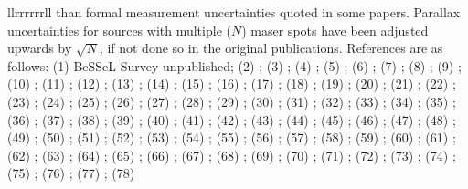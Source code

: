 \documentclass[12pt,preprint]{aastex}
\begin{document}
\begin{deluxetable}{llrrrrrrll}
{than formal measurement uncertainties quoted in some papers.  Parallax uncertainties
for sources with multiple ($N$) maser spots have been adjusted upwards by $\sqrt{N}$,
if not done so in the original publications. 
References are as follows: 
(1) BeSSeL Survey unpublished; 
(2) \citet{Wu:14}; 
(3) \citet{Reid:09c}; 
(4) \citet{Sato:14}; 
(5) \citet{Sanna:09}; 
(6) \citet{Zhang:13b}; 
(7) \citet{Sanna:14}; 
(8) \citet{Immer:13}; 
(9) \citet{Sato:10a}; 
(10) \citet{Xu:11}; 
(11) \citet{Brunthaler:09}; 
(12) \citet{Bartkiewicz:08}; 
(13) \citet{Kurayama:11}; 
(14) \citet{Zhang:09}; 
(15) \citet{Zhang:13}; 
(16) \citet{Xu:09}; 
(17) \citet{Sato:10b}; 
(18) \citet{Oh:10}; 
(19) \citet{Rygl:10}; 
(20) \citet{Nagayama:11}; 
(21) \citet{Xu:13}; 
(22) \citet{Sanna:12}; 
(23) \citet{Ando:11}; 
(24) \citet{Moscadelli:11}; 
(25) \citet{Rygl:12}; 
(26) \citet{Zhang:12b}; 
(27) \citet{Hachi:15}; 
(28) \citet{Choi:13}; 
(29) \citet{Hirota:08}; 
(30) \citet{Moscadelli:09}; 
(31) \citet{Moellenbrock:09}; 
(32) \citet{Sato:08}; 
(33) \citet{Xu:06}; 
(34) \citet{Hachi:06}; 
(35) \citet{Asaki:10}; 
(36) \citet{Hachi:09}; 
(37) \citet{Krishnan15}; 
(38) \citet{Honma:11}; 
(39) \citet{Niinuma:11}; 
(40) \citet{Reid:09a}; 
(41) \citet{Shiozaki:11}; 
(42) \citet{Honma:07}; 
(43) \citet{Sandstrom:07}; 
(44) \citet{Menten:07}; 
(45) \citet{Kim:08}; 
(46) \citet{Choi:08}; 
(47) \citet{Zhang:12a}; 
(48) \citet{Sparks:08}; 
(49) \citet{Burns14}; 
(50) \citet{Burns17}; 
(51) \citet{Zhang18}; 
(52) \citet{Immer18}; 
(53) \citet{Li18}; 
(54) \citet{Rygl18}; 
(55) \citet{Wu19}; 
(56) \citet{Hu18}; 
(57) \citet{Kounkel:17}; 
(58) \citet{Sakai19}; 
(59) \citet{Sanna19}; 
(60) \citet{Moscadelli18}; 
(61) \citet{Krishnan17}; 
(62) \citet{Yamauchi16}; 
(63) \citet{Sanna17}; 
(64) \citet{S.Xu:18}; 
(65) \citet{Nunez:19}; 
(66) \citet{Asaki14}; 
(67) \citet{Chibueze16}; 
(68) \citet{Anna18}; 
(69) \citet{Nagayama:14}; 
(70) \citet{Xu:16}; 
(71) \citet{Nagayama15}; 
(72) \citet{Dzib16}; 
(73) \citet{Sakai15}; 
(74) \citet{Burns14a}; 
(75) \citet{Imai:12}; 
(76) \citet{Chibueze:14}; 
(77) \citet{Kusuno:13}; 
(78) \citet{Sakai:12}
                }
\label{table:parallaxes}
\end{deluxetable}
\end{document}

